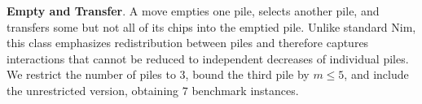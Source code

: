 \documentclass[review]{elsarticle}
\newcommand{\set}[1]{\{ #1 \}}
\newcommand{\tuple}[1]{\langle {#1} \rangle}
\newcommand{\true}{\top}
\newcommand{\statevar}{\mathcal{X}}
\newcommand{\act}{\mathcal{A}}
\newcommand{\constraint}{\mathcal{C}}
\newcommand{\estate}{\mathcal{E}}
\newcommand{\pre}{\mathtt{pre}}
\newcommand{\eff}{\mathtt{eff}}
\begin{document}
{\color{red}\textbf{Empty and Transfer}. A move empties one pile, selects another pile, and transfers some but not all of its chips into the emptied pile.}
{\color{red}Unlike standard Nim, this class emphasizes redistribution between piles and therefore captures interactions that cannot be reduced to independent decreases of individual piles.}
{\color{red}We restrict the number of piles to $3$, bound the third pile by $m \le 5$, and include the unrestricted version, obtaining $7$ benchmark instances.}
\end{document}
